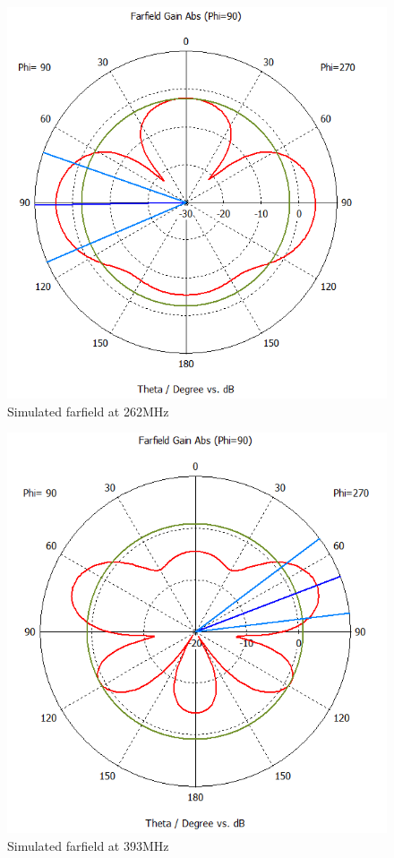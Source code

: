 \begin{figure}[H]
\centering 
\includegraphics[scale = 0.5]{figures/antennas/qha/qha_6_ff_262}
\caption{Simulated farfield at 262MHz}
\label{fig:QHA_ff_262}
\end{figure}

\begin{figure}[H]
\centering 
\includegraphics[scale = 0.5]{figures/antennas/qha/qha_6_ff_393}
\caption{Simulated farfield at 393MHz}
\label{fig:QHA_ff_393}
\end{figure}

